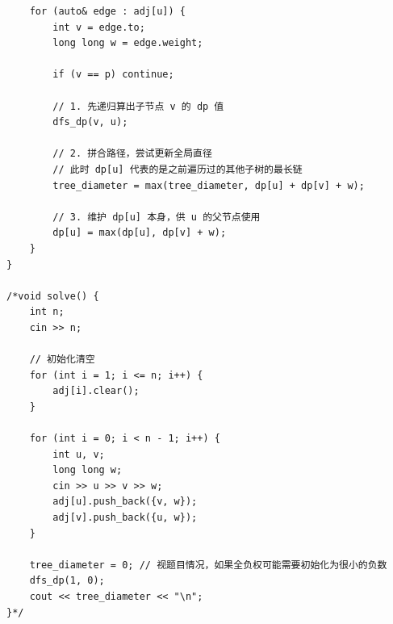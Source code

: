 \documentclass[10pt, a4paper, twocolumn]{article} %
\begin{document}
\begin{lstlisting}
    for (auto& edge : adj[u]) {
        int v = edge.to;
        long long w = edge.weight;
        
        if (v == p) continue;
        
        // 1. 先递归算出子节点 v 的 dp 值
        dfs_dp(v, u);
        
        // 2. 拼合路径，尝试更新全局直径
        // 此时 dp[u] 代表的是之前遍历过的其他子树的最长链
        tree_diameter = max(tree_diameter, dp[u] + dp[v] + w);
        
        // 3. 维护 dp[u] 本身，供 u 的父节点使用
        dp[u] = max(dp[u], dp[v] + w);
    }
}

/*void solve() {
    int n;
    cin >> n;
    
    // 初始化清空
    for (int i = 1; i <= n; i++) {
        adj[i].clear();
    }
    
    for (int i = 0; i < n - 1; i++) {
        int u, v;
        long long w;
        cin >> u >> v >> w;
        adj[u].push_back({v, w});
        adj[v].push_back({u, w});
    }
    
    tree_diameter = 0; // 视题目情况，如果全负权可能需要初始化为很小的负数
    dfs_dp(1, 0);
    cout << tree_diameter << "\n";
}*/
    \end{lstlisting}
\end{document}

